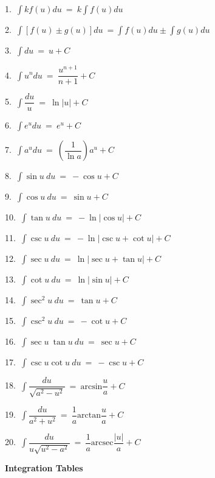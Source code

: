 \documentclass{article}
\begin{document}
\begin{large}
\setlength{\columnsep}{1.2cm}

\begin{multicols*}{2}

1.\ $\displaystyle\int kf(u)du\ =\ k\displaystyle\int f(u)du$

2.\ $\displaystyle\int [f(u)\pm g(u)]du\ =\int f(u)du\pm\int g(u)du$

3.\ $\displaystyle\int du\ =\ u + C$

4.\ $\displaystyle\int u^{n}du\ =\ \dfrac{u^{n+1}}{n+1} + C$

5.\ $\displaystyle\int \dfrac{du}{u}\ =\ \ln|u| + C$

6.\ $\displaystyle\int e^{u}du\ =\ e^{u} + C$

7.\ $\displaystyle\int a^{u}du\ =\ \left(\dfrac{1}{\ln a}\right)a^{u} + C$

8.\ $\displaystyle\int \sin u\ du\ =\ -\cos u + C$

9.\ $\displaystyle\int \cos u\ du\ =\ \sin u + C$

10.\ $\displaystyle\int \tan u\ du\ =\ -\ln|\cos u| + C$

\columnbreak

11.\ $\displaystyle\int \csc u\ du\ =\ -\ln|\csc u + \cot u| + C$

12.\ $\displaystyle\int \sec u\ du\ =\ \ln|\sec u + \tan u| + C$

13.\ $\displaystyle\int \cot u\ du\ =\ \ln|\sin u| + C$

14.\ $\displaystyle\int \sec^{2} u\ du\ =\ \tan u + C$

15.\ $\displaystyle\int \csc^{2} u\ du\ =\ -\cot u + C$

16.\ $\displaystyle\int \sec u\ \tan u\ du\ =\ \sec u + C$

17.\ $\displaystyle\int \csc u\cot u\ du\ =\ -\csc u + C$

18.\ $\displaystyle\int \dfrac{du}{\sqrt{a^{2}-u^{2}}}\ =\ \text{arcsin}\dfrac{u}{a} + C$

19.\ $\displaystyle\int \dfrac{du}{a^{2}+u^{2}}\ =\ \dfrac{1}{a}\text{arctan}\dfrac{u}{a} + C$

20.\ $\displaystyle\int \dfrac{du}{u\sqrt{u^{2}-a^{2}}}\ =\ \dfrac{1}{a}\text{arcsec}\dfrac{|u|}{a} + C$


\end{multicols*}

\newpage


\textbf{Integration Tables}


\end{large}
\end{document}
